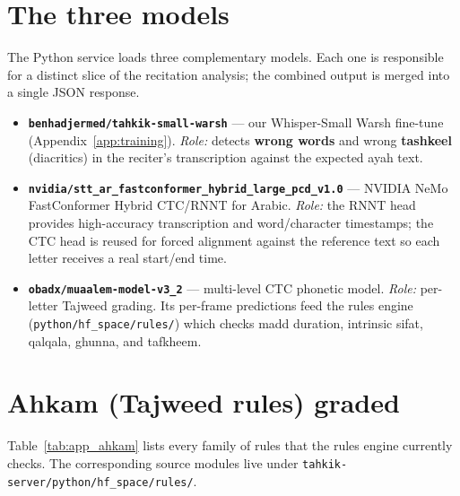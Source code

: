 \section{The three models}
\label{sec:app_server_models}

The Python service loads three complementary models. Each one is
responsible for a distinct slice of the recitation analysis; the
combined output is merged into a single JSON response.

\begin{itemize}
  \item \textbf{\texttt{benhadjermed/tahkik-small-warsh}} --- our
        Whisper-Small Warsh fine-tune (Appendix~\ref{app:training}).
        \emph{Role:} detects \textbf{wrong words} and wrong
        \textbf{tashkeel} (diacritics) in the reciter's transcription
        against the expected ayah text.
  \item \textbf{\texttt{nvidia/stt\_ar\_fastconformer\_hybrid\_large\_pcd\_v1.0}}
        --- NVIDIA NeMo FastConformer Hybrid CTC/RNNT for Arabic.
        \emph{Role:} the RNNT head provides high-accuracy transcription
        and word/character timestamps; the CTC head is reused for forced
        alignment against the reference text so each letter receives a
        real start/end time.
  \item \textbf{\texttt{obadx/muaalem-model-v3\_2}} --- multi-level CTC
        phonetic model. \emph{Role:} per-letter Tajweed grading. Its
        per-frame predictions feed the rules engine
        (\texttt{python/hf\_space/rules/}) which checks madd duration,
        intrinsic sifat, qalqala, ghunna, and tafkheem.
\end{itemize}

\section{Ahkam (Tajweed rules) graded}
\label{sec:app_server_ahkam}

Table~\ref{tab:app_ahkam} lists every family of rules that the rules
engine currently checks. The corresponding source modules live under
\texttt{tahkik-server/python/hf\_space/rules/}.

